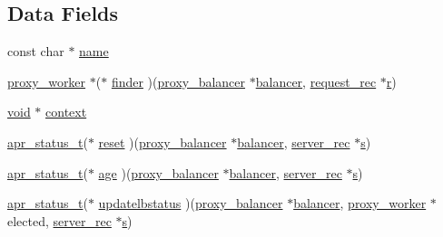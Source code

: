 \subsection*{Data Fields}
\begin{DoxyCompactItemize}
\item 
const char $\ast$ \hyperlink{structproxy__balancer__method_ae95b994676041cb871ee4508dd8ffa05}{name}
\item 
\hyperlink{structproxy__worker}{proxy\+\_\+worker} $\ast$($\ast$ \hyperlink{structproxy__balancer__method_ab0a5402056824384377a61d20712dd15}{finder} )(\hyperlink{structproxy__balancer}{proxy\+\_\+balancer} $\ast$\hyperlink{group__MOD__PROXY_ga7d902f564a33cf9c787a5670b026737b}{balancer}, \hyperlink{structrequest__rec}{request\+\_\+rec} $\ast$\hyperlink{pcregrep_8txt_a2e9e9438b26c0bb4425367a7e4f75eb3}{r})
\item 
\hyperlink{group__MOD__ISAPI_gacd6cdbf73df3d9eed42fa493d9b621a6}{void} $\ast$ \hyperlink{structproxy__balancer__method_af0c6118e64da9ca7746569e43f8544e1}{context}
\item 
\hyperlink{group__apr__errno_gaa5105fa83cc322f09382292db8b47593}{apr\+\_\+status\+\_\+t}($\ast$ \hyperlink{structproxy__balancer__method_a69235b22019397425d2bc4ea3059fe85}{reset} )(\hyperlink{structproxy__balancer}{proxy\+\_\+balancer} $\ast$\hyperlink{group__MOD__PROXY_ga7d902f564a33cf9c787a5670b026737b}{balancer}, \hyperlink{structserver__rec}{server\+\_\+rec} $\ast$\hyperlink{pcretest_8txt_a062597889ba244b72877454b1d3adecf}{s})
\item 
\hyperlink{group__apr__errno_gaa5105fa83cc322f09382292db8b47593}{apr\+\_\+status\+\_\+t}($\ast$ \hyperlink{structproxy__balancer__method_ad1a0fe68a23f296bb2d7b0840adcebba}{age} )(\hyperlink{structproxy__balancer}{proxy\+\_\+balancer} $\ast$\hyperlink{group__MOD__PROXY_ga7d902f564a33cf9c787a5670b026737b}{balancer}, \hyperlink{structserver__rec}{server\+\_\+rec} $\ast$\hyperlink{pcretest_8txt_a062597889ba244b72877454b1d3adecf}{s})
\item 
\hyperlink{group__apr__errno_gaa5105fa83cc322f09382292db8b47593}{apr\+\_\+status\+\_\+t}($\ast$ \hyperlink{structproxy__balancer__method_adfbccbb12f625e1f5e485dab605366e2}{updatelbstatus} )(\hyperlink{structproxy__balancer}{proxy\+\_\+balancer} $\ast$\hyperlink{group__MOD__PROXY_ga7d902f564a33cf9c787a5670b026737b}{balancer}, \hyperlink{structproxy__worker}{proxy\+\_\+worker} $\ast$elected, \hyperlink{structserver__rec}{server\+\_\+rec} $\ast$\hyperlink{pcretest_8txt_a062597889ba244b72877454b1d3adecf}{s})
\end{DoxyCompactItemize}


